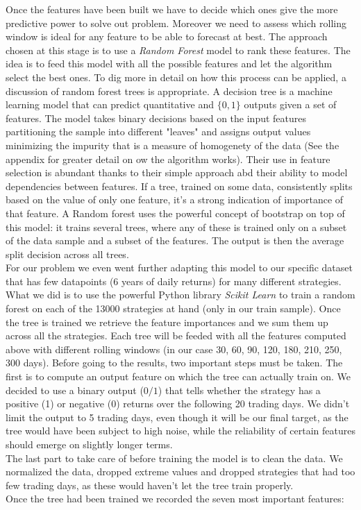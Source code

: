 \documentclass[a4paper]{article}
\begin{document}
Once the features have been built we have to decide which ones give the more predictive power to solve out problem. Moreover we need to assess which rolling window is ideal for any feature to be able to forecast at best. The approach chosen at this stage is to use a \textit{Random Forest} model to rank these features. The idea is to feed this model with all the possible features and let the algorithm select the best ones. To dig more in detail on how this process can be applied, a discussion of random forest trees is appropriate. A decision tree is a machine learning model that can predict quantitative and $\{0,1\}$ outputs given a set of features. The model takes binary decisions based on the input features partitioning the sample into different "leaves" and assigns output values minimizing the impurity that is a measure of homogenety of the data (See the appendix for greater detail on ow the algorithm works). Their use in feature selection is abundant thanks to their simple approach abd their ability to model dependencies between features. If a tree, trained on some data, consistently splits based on the value of only one feature, it's a strong indication of importance of that feature. A Random forest uses the powerful concept of bootstrap on top of this model: it trains several trees, where any of these is trained only on a subset of the data sample and a subset of the features. The output is then the average split decision across all trees.\\
For our problem we even went further adapting this model to our specific dataset that has few datapoints (6 years of daily returns) for many different strategies. What we did is to use the powerful Python library \textit{Scikit Learn} to train a random forest on each of the 13000 strategies at hand (only in our train sample). Once the tree is trained we retrieve the feature importances and we sum them up across all the strategies. Each tree will be feeded with all the features computed above with different rolling windows (in our case 30, 60, 90, 120, 180, 210, 250, 300 days). Before going to the results, two important steps must be taken. The first is to compute an output feature on which the tree can actually train on. We decided to use a binary output ($0/1$) that tells whether the strategy has a positive (1) or negative (0) returns over the following  20 trading days. We didn't limit the output to 5 trading days, even though it will be our final target, as the tree would have been subject to high noise, while the reliability of certain features should emerge on slightly longer terms.\\
The last part to take care of before training the model is to clean the data. We normalized the data, dropped extreme values and dropped strategies that had too few trading days, as these would haven't let the tree train properly.\\
Once the tree had been trained we recorded the seven most important features: 
\end{document}
